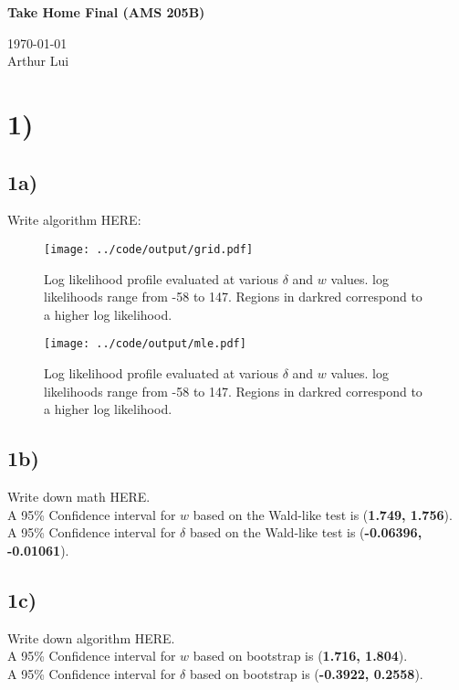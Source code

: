\documentclass[11pt]{article}
\def\wl{\par \vspace{\baselineskip}\noindent}
\def\beginmyfig{\begin{figure}[H]\center} %
\def\endmyfig{\end{figure}}
\def\hline{ \textcolor{lgrey}{\hrulefill} }
\begin{document}
\begin{center}
  {\huge \textbf{Take Home Final (AMS 205B)}
  }\\
  \wl
  \noindent\today\\
  Arthur Lui\\
  \hline
\end{center}

\section*{1)}
\subsection*{1a)}
Write algorithm HERE:\\

\beginmyfig
  \texttt{[image: ../code/output/grid.pdf]}
  \caption{\small Log likelihood profile evaluated at various $\delta$ and $w$ values. log likelihoods range from -58 to 147. Regions in darkred correspond to a higher log likelihood.}
  \label{fig:grid}
\endmyfig

\beginmyfig
  \texttt{[image: ../code/output/mle.pdf]}
  \caption{\small Log likelihood profile evaluated at various $\delta$ and $w$ values. log likelihoods range from -58 to 147. Regions in darkred correspond to a higher log likelihood.}
  \label{fig:grid}
\endmyfig

\subsection*{1b)}
Write down math HERE.\\

\noindent
A 95\% Confidence interval for $w$ based on the Wald-like test is (\textbf{1.749, 1.756}).\\
A 95\% Confidence interval for $\delta$ based on the Wald-like test is (\textbf{-0.06396, -0.01061}).

\subsection*{1c)}
Write down algorithm HERE.\\

\noindent
A 95\% Confidence interval for $w$ based on bootstrap is (\textbf{1.716, 1.804}).\\
A 95\% Confidence interval for $\delta$ based on bootstrap is (\textbf{-0.3922, 0.2558}).\\
\end{document}
